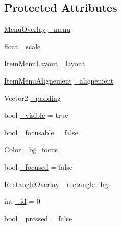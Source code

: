 \subsection*{Protected Attributes}
\begin{DoxyCompactItemize}
\item 
\hyperlink{classgearit_1_1src_1_1utility_1_1_menu_1_1_menu_overlay}{Menu\+Overlay} \hyperlink{classgearit_1_1src_1_1utility_1_1_menu_1_1_menu_item_af2f460de9056b10393354881be6ded3c}{\+\_\+menu}
\item 
float \hyperlink{classgearit_1_1src_1_1utility_1_1_menu_1_1_menu_item_a56e8046746f04bc4c559b151f886de37}{\+\_\+scale}
\item 
\hyperlink{namespacegearit_1_1src_1_1utility_1_1_menu_a3ca3e98c7e2f44227e0fd6263822c56a}{Item\+Menu\+Layout} \hyperlink{classgearit_1_1src_1_1utility_1_1_menu_1_1_menu_item_ac4ea1d5e5d6269990f687290255303b8}{\+\_\+layout}
\item 
\hyperlink{namespacegearit_1_1src_1_1utility_1_1_menu_a4312fcb06a1685782d1246bfeefdbd3b}{Item\+Menu\+Alignement} \hyperlink{classgearit_1_1src_1_1utility_1_1_menu_1_1_menu_item_ae8396883492689cb00b73b45d427c847}{\+\_\+alignement}
\item 
Vector2 \hyperlink{classgearit_1_1src_1_1utility_1_1_menu_1_1_menu_item_a996d11a5c090384cb356d224e6f19c93}{\+\_\+padding}
\item 
bool \hyperlink{classgearit_1_1src_1_1utility_1_1_menu_1_1_menu_item_a8e5b388efca569d70cc274a4d78fa213}{\+\_\+visible} = true
\item 
bool \hyperlink{classgearit_1_1src_1_1utility_1_1_menu_1_1_menu_item_ad55b72b1742231c4541d4ad632689065}{\+\_\+focusable} = false
\item 
Color \hyperlink{classgearit_1_1src_1_1utility_1_1_menu_1_1_menu_item_a7282503b4506054fca4eeb5a202cf289}{\+\_\+bg\+\_\+focus}
\item 
bool \hyperlink{classgearit_1_1src_1_1utility_1_1_menu_1_1_menu_item_af73d1993f72e14ff070d455769831ec6}{\+\_\+focused} = false
\item 
\hyperlink{classgearit_1_1src_1_1utility_1_1_rectangle_overlay}{Rectangle\+Overlay} \hyperlink{classgearit_1_1src_1_1utility_1_1_menu_1_1_menu_item_a71e5bf457c8a2d49674dee7b5cd71e59}{\+\_\+rectangle\+\_\+bg}
\item 
int \hyperlink{classgearit_1_1src_1_1utility_1_1_menu_1_1_menu_item_afad7e072fb6c80057558d345eb233381}{\+\_\+id} = 0
\item 
bool \hyperlink{classgearit_1_1src_1_1utility_1_1_menu_1_1_menu_item_a7837039c11a0f38c0dc8d6dd1a41e54b}{\+\_\+pressed} = false

\end{DoxyCompactItemize}
